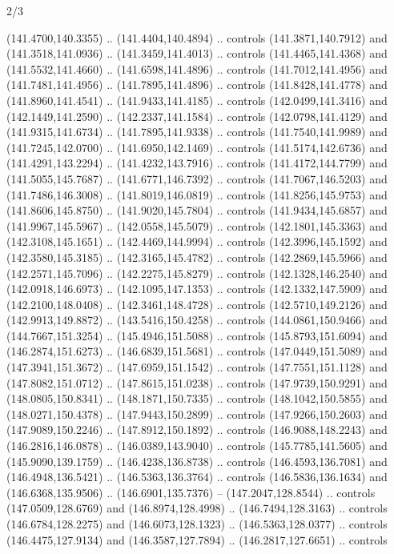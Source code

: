 \begin{flagdescription}{2/3}
\begin{scope}[shift={(0.5\flaglength,0.5)},scale=\flagwidth/320]
\begin{scope}[y=0.8pt, x=0.8pt, yscale=-1,shift={(-118.3,-146)}]
  (141.4700,140.3355) .. (141.4404,140.4894) .. controls (141.3871,140.7912) and
  (141.3518,141.0936) .. (141.3459,141.4013) .. controls (141.4465,141.4368) and
  (141.5532,141.4660) .. (141.6598,141.4896) .. controls (141.7012,141.4956) and
  (141.7481,141.4956) .. (141.7895,141.4896) .. controls (141.8428,141.4778) and
  (141.8960,141.4541) .. (141.9433,141.4185) .. controls (142.0499,141.3416) and
  (142.1449,141.2590) .. (142.2337,141.1584) .. controls (142.0798,141.4129) and
  (141.9315,141.6734) .. (141.7895,141.9338) .. controls (141.7540,141.9989) and
  (141.7245,142.0700) .. (141.6950,142.1469) .. controls (141.5174,142.6736) and
  (141.4291,143.2294) .. (141.4232,143.7916) .. controls (141.4172,144.7799) and
  (141.5055,145.7687) .. (141.6771,146.7392) .. controls (141.7067,146.5203) and
  (141.7486,146.3008) .. (141.8019,146.0819) .. controls (141.8256,145.9753) and
  (141.8606,145.8750) .. (141.9020,145.7804) .. controls (141.9434,145.6857) and
  (141.9967,145.5967) .. (142.0558,145.5079) .. controls (142.1801,145.3363) and
  (142.3108,145.1651) .. (142.4469,144.9994) .. controls (142.3996,145.1592) and
  (142.3580,145.3185) .. (142.3165,145.4782) .. controls (142.2869,145.5966) and
  (142.2571,145.7096) .. (142.2275,145.8279) .. controls (142.1328,146.2540) and
  (142.0918,146.6973) .. (142.1095,147.1353) .. controls (142.1332,147.5909) and
  (142.2100,148.0408) .. (142.3461,148.4728) .. controls (142.5710,149.2126) and
  (142.9913,149.8872) .. (143.5416,150.4258) .. controls (144.0861,150.9466) and
  (144.7667,151.3254) .. (145.4946,151.5088) .. controls (145.8793,151.6094) and
  (146.2874,151.6273) .. (146.6839,151.5681) .. controls (147.0449,151.5089) and
  (147.3941,151.3672) .. (147.6959,151.1542) .. controls (147.7551,151.1128) and
  (147.8082,151.0712) .. (147.8615,151.0238) .. controls (147.9739,150.9291) and
  (148.0805,150.8341) .. (148.1871,150.7335) .. controls (148.1042,150.5855) and
  (148.0271,150.4378) .. (147.9443,150.2899) .. controls (147.9266,150.2603) and
  (147.9089,150.2246) .. (147.8912,150.1892) .. controls (146.9088,148.2243) and
  (146.2816,146.0878) .. (146.0389,143.9040) .. controls (145.7785,141.5605) and
  (145.9090,139.1759) .. (146.4238,136.8738) .. controls (146.4593,136.7081) and
  (146.4948,136.5421) .. (146.5363,136.3764) .. controls (146.5836,136.1634) and
  (146.6368,135.9506) .. (146.6901,135.7376) -- (147.2047,128.8544) .. controls
  (147.0509,128.6769) and (146.8974,128.4998) .. (146.7494,128.3163) .. controls
  (146.6784,128.2275) and (146.6073,128.1323) .. (146.5363,128.0377) .. controls
  (146.4475,127.9134) and (146.3587,127.7894) .. (146.2817,127.6651) .. controls

\end{scope}
\end{scope}
\end{flagdescription}
